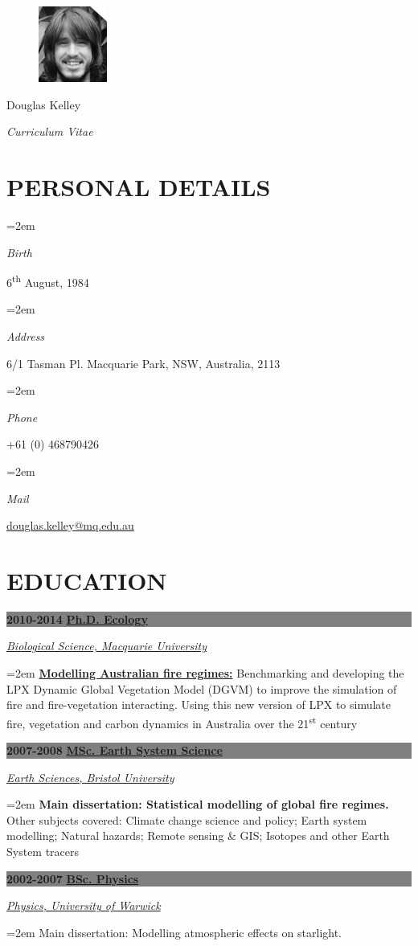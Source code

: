\documentclass[paper=a4,fontsize=11pt]{scrartcl}	 			%
\newlength{\spacebox}
\newcommand{\sepspace}{\vspace*{0em}}			%
\newcommand{\NewPart}[1]{\vspace*{-0.5em} \section*{\uppercase{#1}} \vspace*{-0.75em} }
\newcommand{\MyName}[1]{
		\Huge \usefont{OT1}{phv}{b}{n} \hfill #1 		%
		\par \normalsize \normalfont}
\newcommand{\MySlogan}[1]{
		\large \usefont{OT1}{phv}{m}{n}\hfill \textit{#1} %
		\par \normalsize \normalfont}
\newcommand{\PersonalEntry}[2]{
		\noindent\hangindent=2em\hangafter=0 		%
		\parbox{\spacebox}{						%
		\textit{#1}}								%
		\hspace{1.5em} #2 \par}					%
\newcommand{\EducationEntry}[4]{ \vspace*{0.7em}
		\noindent \colorbox{gray}{%
			\parbox{46em}{%
			\color{Black}\textbf{#2} \hspace{0.5cm} \textbf{#1}}} 				%
		\vspace*{-1em}
		\hfill 	\par				%
		\noindent \textit{#3} \par					%
		\noindent\hangindent=2em\hangafter=0 \small #4 	%
		\normalsize \par}
\begin{document}
\begin{figure}
	\vspace*{-4em}
		\includegraphics[width=0.2\textwidth]{Doug-Kelley.jpg}
\end{figure}

\MyName{Douglas Kelley}
\MySlogan{Curriculum Vitae}

\sepspace

\NewPart{Personal details}{}

\PersonalEntry{Birth}{6\textsuperscript{th} August, 1984} 
\PersonalEntry{Address}{6/1 Tasman Pl. Macquarie Park, NSW, Australia, 2113}
\PersonalEntry{Phone}{+61 (0) 468790426}
\PersonalEntry{Mail}{\url{douglas.kelley@mq.edu.au}}

\NewPart{Education}{} 

\EducationEntry{\href{http://bcd.mq.edu.au/?page_id=171}{Ph.D. Ecology}}{2010-2014}{\href{http://bio.mq.edu.au/}{Biological Science, Macquarie University}}
  {\textbf{\href{http://bcd.mq.edu.au/?p=361}{Modelling Australian fire regimes:}} Benchmarking and developing the LPX Dynamic Global Vegetation Model (DGVM) to improve the simulation of fire and fire-vegetation interacting. Using this new version of LPX to simulate fire, vegetation and carbon dynamics in Australia over the 21\textsuperscript{st} century}
\sepspace

\EducationEntry{\href{http://www.bristol.ac.uk/cabot/postgrad/msc-ccsp.html}
             {MSc. Earth System Science}}{2007-2008}{\href{http://www.bristol.ac.uk/earthsciences/}{Earth Sciences, Bristol University}}
  {\textbf{Main dissertation: Statistical modelling of global fire regimes.} Other subjects covered: Climate change science and policy; Earth system modelling; Natural hazards; Remote sensing \& GIS; Isotopes and other Earth System tracers}
\sepspace

\EducationEntry{\href{http://www2.warwick.ac.uk/study/undergraduate/courses/f300}{BSc. Physics}}{2002-2007}{\href{http://www2.warwick.ac.uk/fac/sci/physics/}{Physics, University of Warwick}}
  {Main dissertation: Modelling atmospheric effects on starlight.}
  
\end{document}
